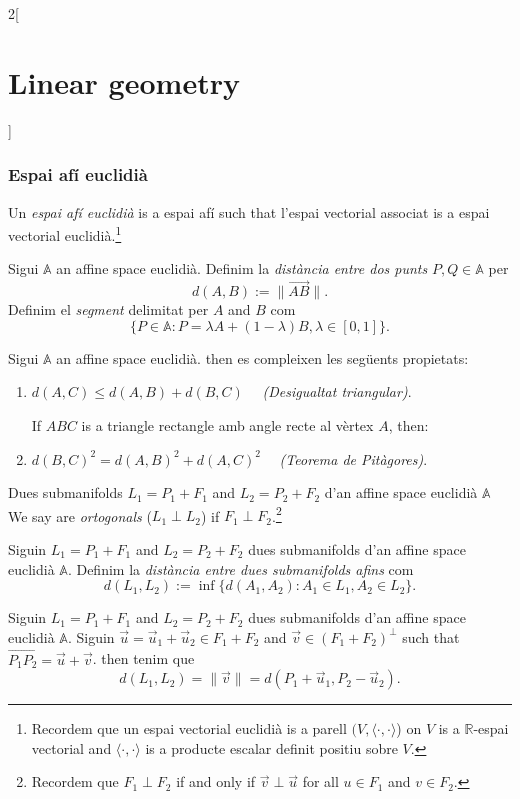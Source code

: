 \documentclass[class=article,10pt,crop=false]{standalone}
\begin{document}
\begin{multicols}{2}[\section{Linear geometry}]
\subsubsection{Espai afí euclidià}
\begin{definition}
Un \textit{espai afí euclidià} is a espai afí such that l'espai vectorial associat is a espai vectorial euclidià.\footnote{Recordem que un espai vectorial euclidià is a parell $(V,\langle\cdot,\cdot\rangle$) on $V$ is a $\mathbb{R}$-espai vectorial and $\langle\cdot,\cdot\rangle$ is a producte escalar definit positiu sobre $V$.}
\end{definition}
\begin{definition}
Sigui $\mathbb{A}$ an affine space euclidià. Definim la \textit{distància entre dos punts} $P,Q\in\mathbb{A}$ per $$d(A,B):=\|\overrightarrow{AB}\|.$$ Definim el \textit{segment} delimitat per $A$ and $B$ com $$\{P\in\mathbb{A}:P=\lambda A+(1-\lambda)B,\lambda\in[0,1]\}.$$
\end{definition}
\begin{prop}
Sigui $\mathbb{A}$ an affine space euclidià. then es compleixen les següents propietats:
\begin{enumerate}
    \item $d(A,C)\leq d(A,B)+d(B,C)\quad$ \textit{(Desigualtat triangular)}.\par If $ABC$ is a triangle rectangle amb angle recte al vèrtex $A$, then:
    \item  $d(B,C)^2=d(A,B)^2+d(A,C)^2\quad$ \textit{(Teorema de Pitàgores)}.
\end{enumerate}
\end{prop}
\begin{definition}
Dues submanifolds $L_1=P_1+F_1$ and $L_2=P_2+F_2$ d'an affine space euclidià $\mathbb{A}$ We say are \textit{ortogonals} ($L_1\perp L_2$) if $F_1\perp F_2$.\footnote{Recordem que $F_1\perp F_2$ if and only if $\overrightarrow{v}\perp\overrightarrow{u}$ for all $u\in F_1$ and $v\in F_2$.}
\end{definition}
\begin{definition}
Siguin $L_1=P_1+F_1$ and $L_2=P_2+F_2$ dues submanifolds d'an affine space euclidià $\mathbb{A}$. Definim la \textit{distància entre dues submanifolds afins} com $$d(L_1,L_2):=\inf\{d(A_1,A_2):A_1\in L_1, A_2\in L_2\}.$$
\end{definition}
\begin{theorem}
Siguin $L_1=P_1+F_1$ and $L_2=P_2+F_2$ dues submanifolds d'an affine space euclidià $\mathbb{A}$. Siguin $\overrightarrow{u}=\overrightarrow{u}_1+\overrightarrow{u}_2\in F_1+F_2$ and $\overrightarrow{v}\in(F_1+F_2)^\perp$ such that $\overrightarrow{P_1P_2}=\overrightarrow{u}+\overrightarrow{v}$. then tenim que $$d(L_1,L_2)=\|\overrightarrow{v}\|=d(P_1+\overrightarrow{u}_1,P_2-\overrightarrow{u}_2).$$
\end{theorem}

\end{multicols}
\end{document}
